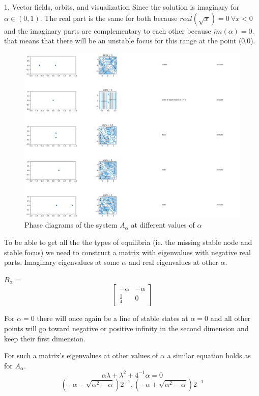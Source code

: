 \begin{task}{1, Vector fields, orbits, and visualization}
Since the solution is imaginary for $\alpha \in (0,1)$. The real part is the same for both because $real(\sqrt{x}) = 0 \ \forall x < 0$ and the imaginary parts are complementary to each other because $im(\alpha) = 0$. that means that there will be an unstable focus for this range at the point (0,0).

\begin{figure}[H]
    \centering
    \includegraphics[width=1\textwidth]{images/bfdlinear.png}
    \caption{Phase diagrams of the system $A_\alpha$ at different values of $\alpha$}
    \label{fig:bfdlinear}
\end{figure}

To be able to get all the the types of equilibria (ie. the missing stable node and stable focus) we need to construct a matrix with eigenvalues with negative real parts. Imaginary eigenvalues at some $\alpha$ and real eigenvalues at other $\alpha$.

$B_\alpha$ = $$\begin{bmatrix}
-\alpha & -\alpha\\
\frac{1}{4} & 0
\end{bmatrix}$$

For $\alpha = 0$ there will once again be a line of stable states at $\alpha = 0$ and all other points will go toward negative or positive infinity in the second dimension and keep their first dimension.

For such a matrix's eigenvalues at other values of $\alpha$ a similar equation holds as for $A_\alpha$.
$$\alpha\lambda + \lambda^2 + 4^{-1}\alpha = 0$$
$$(-\alpha - \sqrt{\alpha^2-\alpha})2^{-1}, (-\alpha + \sqrt{\alpha^2-\alpha})2^{-1}$$


\end{task}
